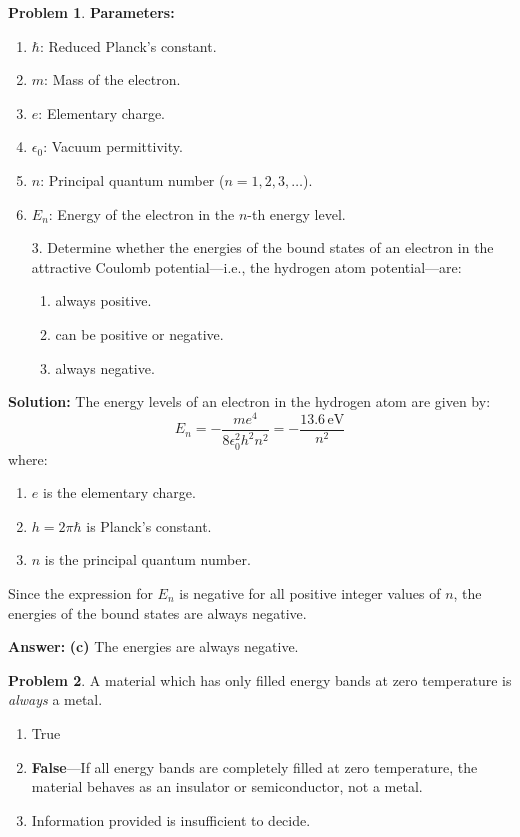 \documentclass[12pt]{article}
\theoremstyle{definition} %
\newtheorem{problem}{Problem}
\theoremstyle{plain} %
\begin{document}
\begin{problem}
    \textbf{Parameters:}
\begin{enumerate}
    \item \(\hbar\): Reduced Planck's constant.
    \item \(m\): Mass of the electron.
    \item \(e\): Elementary charge.
    \item \(\epsilon_0\): Vacuum permittivity.
    \item \(n\): Principal quantum number (\(n = 1, 2, 3, \dots\)).
    \item \(E_n\): Energy of the electron in the \(n\)-th energy level.
\end{enumerate}

\begin{enumerate}
    \item[3.] Determine whether the energies of the bound states of an electron in the attractive Coulomb potential—i.e., the hydrogen atom potential—are:
    \begin{enumerate}
        \item always positive.
        \item can be positive or negative.
        \item always negative.
    \end{enumerate}
\end{enumerate}

\textbf{Solution:} The energy levels of an electron in the hydrogen atom are given by:
$$
E_n = -\frac{m e^4}{8 \epsilon_0^2 h^2 n^2} = -\frac{13.6\,\text{eV}}{n^2}
$$
where:
\begin{enumerate}
    \item \(e\) is the elementary charge.
    \item \(h = 2\pi\hbar\) is Planck's constant.
    \item \(n\) is the principal quantum number.
\end{enumerate}
Since the expression for \(E_n\) is negative for all positive integer values of \(n\), the energies of the bound states are always negative.

\textbf{Answer:} \textbf{(c)} The energies are always negative.

\end{problem}
\begin{problem}
    A material which has only filled energy bands at zero temperature is \textit{always} a metal.

    \begin{enumerate}
        \item True
        \item \textbf{False}—If all energy bands are completely filled at zero temperature, the material behaves as an insulator or semiconductor, not a metal.
        \item Information provided is insufficient to decide.
    \end{enumerate} 
\end{problem}
\end{document}
